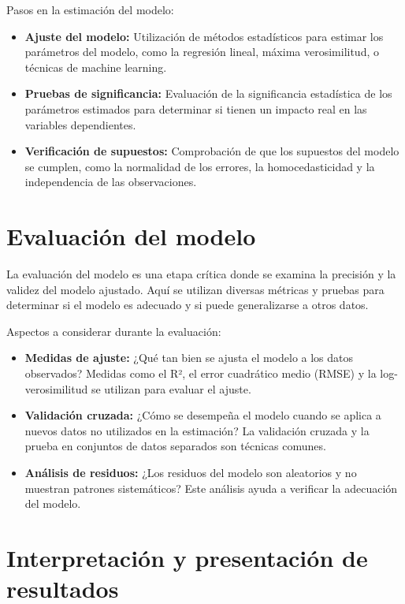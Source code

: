 \documentclass[
  letterpaper,
  DIV=11,
  numbers=noendperiod]{scrreprt}
\providecommand{\tightlist}{%
  \setlength{\itemsep}{0pt}\setlength{\parskip}{0pt}}\usepackage{longtable,booktabs,array}
\begin{document}
Pasos en la estimación del modelo:

\begin{itemize}
\tightlist
\item
  \textbf{Ajuste del modelo:} Utilización de métodos estadísticos para
  estimar los parámetros del modelo, como la regresión lineal, máxima
  verosimilitud, o técnicas de machine learning.
\item
  \textbf{Pruebas de significancia:} Evaluación de la significancia
  estadística de los parámetros estimados para determinar si tienen un
  impacto real en las variables dependientes.
\item
  \textbf{Verificación de supuestos:} Comprobación de que los supuestos
  del modelo se cumplen, como la normalidad de los errores, la
  homocedasticidad y la independencia de las observaciones.
\end{itemize}

\section{Evaluación del modelo}\label{evaluaciuxf3n-del-modelo}

La evaluación del modelo es una etapa crítica donde se examina la
precisión y la validez del modelo ajustado. Aquí se utilizan diversas
métricas y pruebas para determinar si el modelo es adecuado y si puede
generalizarse a otros datos.

Aspectos a considerar durante la evaluación:

\begin{itemize}
\tightlist
\item
  \textbf{Medidas de ajuste:} ¿Qué tan bien se ajusta el modelo a los
  datos observados? Medidas como el R², el error cuadrático medio (RMSE)
  y la log-verosimilitud se utilizan para evaluar el ajuste.
\item
  \textbf{Validación cruzada:} ¿Cómo se desempeña el modelo cuando se
  aplica a nuevos datos no utilizados en la estimación? La validación
  cruzada y la prueba en conjuntos de datos separados son técnicas
  comunes.
\item
  \textbf{Análisis de residuos:} ¿Los residuos del modelo son aleatorios
  y no muestran patrones sistemáticos? Este análisis ayuda a verificar
  la adecuación del modelo.
\end{itemize}

\section{Interpretación y presentación de
resultados}\label{interpretaciuxf3n-y-presentaciuxf3n-de-resultados}
\end{document}
